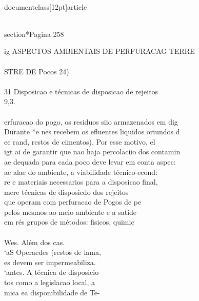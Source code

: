\\documentclass[12pt]{article}
\begin{document}
\\section*{Pagina 258}

ig ASPECTOS AMBIENTAIS DE PERFURACAG TERRE\\
\\
STRE DE Pocos 24)\\
\\
31 Disposicao e técnicas de disposicao de rejeitos\\
9,3.\\
\\
erfuracao do pogo, os residuos siio armazenados em dig\\
Durante *e nes recebem os efluentes liquidos oriundos d\\
ee rand, restos de cimentos). Por esse motivo, el\\
igt ai de garantir que nao haja percolaciio dos contamin\\
ae dequada para cada poco deve levar em conta aspec:\\
ae alae do ambiente, a viabilidade técnico-econd:\\
re e materiais necessarios para a disposicao final,\\
mere técnicas de disposicdo dos rejeitos\\
que operam com perfuracao de Pogos de pe\\
pelos mesmos ao meio ambiente e a satide\\
em rés grupos de métodos: fisicos, quimic\\
\\
Wes. Além dos cas.\\
‘aS Operacdes (restos de lama,\\
es devem ser impermeabiliza.\\
‘antes. A técnica de disposicio\\
tos como a legislacao local, a\\
mica ea disponibilidade de Te-\\
\\
\end{document}
